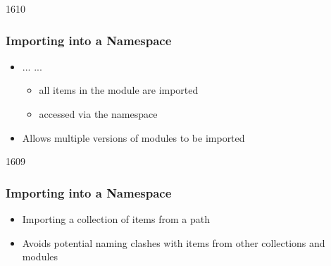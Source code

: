 
\begin{slide}{1610}\frametitle{Importing into a Namespace}


\begin{itemize}
\item {} ...  ...
  \begin{itemize}
  \item all items in the  module are imported
  \item accessed via the  namespace
  \end{itemize}
\item Allows multiple versions of modules to be imported
\end{itemize}


\end{slide}


\begin{slide}{1609}\frametitle{Importing into a Namespace}


\begin{itemize}
\item Importing a collection of items from a path
\item Avoids potential naming clashes with items from other collections
      and modules
\end{itemize}


\end{slide}

